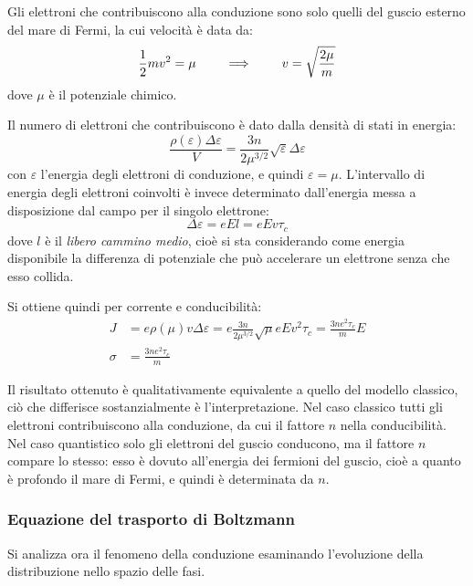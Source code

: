 Gli elettroni che contribuiscono alla conduzione sono solo quelli del guscio esterno del mare di Fermi, la cui velocità è data da:
\begin{equation*}
\frac{1}{2} m v^2 = \mu \qquad\implies\qquad v = \sqrt{\frac{2\mu}{m}}
\end{equation*}
dove $ \mu $ è il potenziale chimico.

Il numero di elettroni che contribuiscono è dato dalla densità di stati in energia:
\begin{equation*}
\frac{\rho(\varepsilon) \Delta \varepsilon}{V} = \frac{3 n}{2 \mu^{3/2}} \sqrt{\varepsilon} \Delta \varepsilon
\end{equation*}
con $ \varepsilon $ l'energia degli elettroni di conduzione, e quindi $ \varepsilon = \mu $. L'intervallo di energia degli elettroni coinvolti è invece determinato dall'energia messa a disposizione dal campo per il singolo elettrone:
\begin{equation*}
\Delta \varepsilon = e E l = e E v \tau_c
\end{equation*}
dove $ l $ è il \textit{libero cammino medio}, cioè si sta considerando come energia disponibile la differenza di potenziale che può accelerare un elettrone senza che esso collida. 

Si ottiene quindi per corrente e conducibilità:
\begin{align*}
J &= e \rho(\mu) v \Delta \varepsilon = e \frac{3n}{2 \mu^{3/2}} \sqrt{\mu} e E v^2 \tau_c = \frac{3ne^2 \tau_c}{m} E\\
\sigma &= \frac{3ne^2 \tau_c}{m}
\end{align*}

Il risultato ottenuto è qualitativamente equivalente a quello del modello classico, ciò che differisce sostanzialmente è l'interpretazione. Nel caso classico tutti gli elettroni contribuiscono alla conduzione, da cui il fattore $ n $ nella conducibilità. Nel caso quantistico solo gli elettroni del guscio conducono, ma il fattore $ n $ compare lo stesso: esso è dovuto all'energia dei fermioni del guscio, cioè a quanto è profondo il mare di Fermi, e quindi è determinata da $ n $.

\subsubsection{Equazione del trasporto di Boltzmann}

Si analizza ora il fenomeno della conduzione esaminando l'evoluzione della distribuzione nello spazio delle fasi.
\newline

